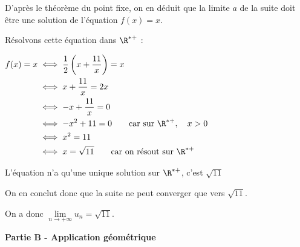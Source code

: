\begin{enumerate}
D'après le théorème du point fixe, on en déduit que la limite $a$ de la suite doit être une solution de l'équation $f(x) = x$.

Résolvons cette équation dans $\R^{*+}$ :

$\begin{aligned}  f(x) = x &\iff \dfrac{1}{2}\left(x + \dfrac{11}{x}\right) = x\\
&\iff x+ \dfrac{11}{x} = 2x\\
&\iff -x + \dfrac{11}{x} = 0\\
&\iff -x^2 + 11 = 0 \qquad \text{car sur }\R^{*+}, \quad x>0\\
&\iff x^2 = 11\\
&\iff x = \sqrt{11} \qquad \text{car on résout sur }\R^{*+}		\\ \end{aligned}$

L'équation n'a qu'une unique solution sur $\R^{*+}$, c'est $\sqrt{11}$

On en conclut donc que la suite ne peut converger que vers $\sqrt{11}$.

On a donc $\lim\limits_{n \to +\infty} u_n = \sqrt{11}$.
\end{enumerate}

\medskip

\textbf{Partie B - Application géométrique}

\medskip

